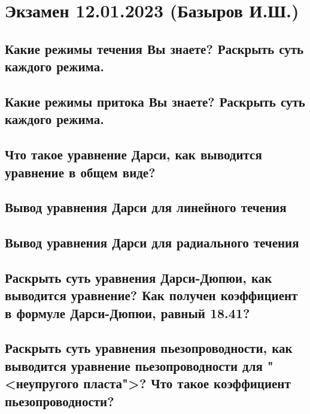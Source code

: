 \documentclass[main.tex]{subfiles}
\begin{document}

\section{Экзамен 12.01.2023 (Базыров И.Ш.)}

\subsection{Какие режимы течения Вы знаете? Раскрыть суть каждого режима.}

\newpage

\subsection{Какие режимы притока Вы знаете? Раскрыть суть каждого режима.}

\newpage

\subsection{Что такое уравнение Дарси, как выводится уравнение в общем виде?}

\newpage

\subsection{Вывод уравнения Дарси для линейного течения}

\newpage

\subsection{Вывод уравнения Дарси для радиального течения}

\newpage

\subsection{Раскрыть суть уравнения Дарси-Дюпюи, как выводится уравнение? Как получен коэффициент в формуле Дарси-Дюпюи, равный 18.41?}

\newpage

\subsection{Раскрыть суть уравнения пьезопроводности, как выводится уравнение пьезопроводности для "<неупругого пласта">? Что такое коэффициент пьезопроводности?}
\end{document}
